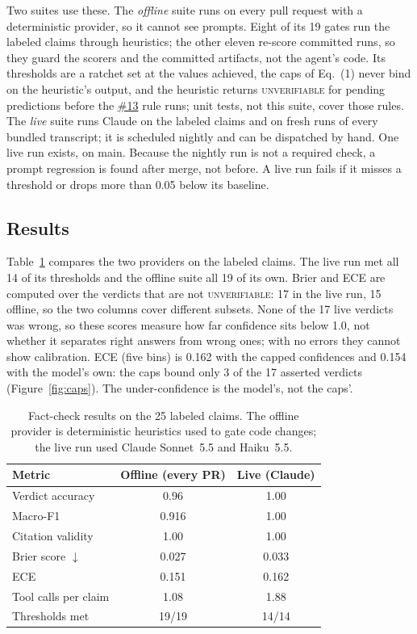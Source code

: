 \documentclass[11pt]{article}
\newcommand{\U}{\textsc{unverifiable}}
\newcommand{\gh}[1]{\href{https://github.com/Organized-AI/podcast-agent/issues/#1}{\##1}}
\begin{document}
Two suites use these. The \emph{offline} suite runs on every pull request with a deterministic provider, so it cannot see prompts. Eight of its 19 gates run the labeled claims through heuristics; the other eleven re-score committed runs, so they guard the scorers and the committed artifacts, not the agent's code. Its thresholds are a ratchet set at the values achieved, the caps of Eq.~(1) never bind on the heuristic's output, and the heuristic returns \U{} for pending predictions before the \gh{13} rule runs; unit tests, not this suite, cover those rules. The \emph{live} suite runs Claude on the labeled claims and on fresh runs of every bundled transcript; it is scheduled nightly and can be dispatched by hand. One live run exists, on main. Because the nightly run is not a required check, a prompt regression is found after merge, not before. A live run fails if it misses a threshold or drops more than 0.05 below its baseline.

\subsection{Results}
Table~\ref{tab:factcheck} compares the two providers on the labeled claims. The live run met all 14 of its thresholds and the offline suite all 19 of its own. Brier and ECE are computed over the verdicts that are not \U{}: 17 in the live run, 15 offline, so the two columns cover different subsets. None of the 17 live verdicts was wrong, so these scores measure how far confidence sits below 1.0, not whether it separates right answers from wrong ones; with no errors they cannot show calibration. ECE (five bins) is 0.162 with the capped confidences and 0.154 with the model's own: the caps bound only 3 of the 17 asserted verdicts (Figure~\ref{fig:caps}). The under-confidence is the model's, not the caps'.

\begin{table}[t]
\centering\small
\caption{Fact-check results on the 25 labeled claims. The offline provider is deterministic heuristics used to gate code changes; the live run used Claude Sonnet~5.5 and Haiku~5.5.}\label{tab:factcheck}
\begin{tabular}{@{}lcc@{}}
\toprule
Metric & Offline (every PR) & Live (Claude) \\
\midrule
Verdict accuracy & 0.96 & 1.00 \\
Macro-F1 & 0.916 & 1.00 \\
Citation validity & 1.00 & 1.00 \\
Brier score $\downarrow$ & 0.027 & 0.033 \\
ECE & 0.151 & 0.162 \\
Tool calls per claim & 1.08 & 1.88 \\
Thresholds met & 19/19 & 14/14 \\
\bottomrule
\end{tabular}
\end{table}
\end{document}
